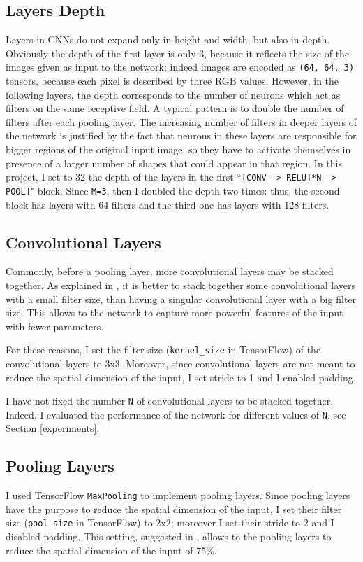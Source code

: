 \documentclass{article}
\begin{document}
\subsection{Layers Depth}
Layers in CNNs do not expand only in height and width, but also in depth.
Obviously the depth of the first layer is only 3, because it reflects the size of the images given as input to the network; indeed images are encoded as \texttt{(64, 64, 3)} tensors, because each pixel is described by three RGB values.
However, in the following layers, the depth corresponds to the number of neurons which act as filters on the same receptive field.
A typical pattern is to double the number of filters after each pooling layer.
The increasing number of filters in deeper layers of the network is justified by the fact that neurons in these layers are responsible for bigger regions of the original input image: so they have to activate themselves in presence of a larger number of shapes that could appear in that region.
In this project, I set to 32 the depth of the layers in the first ``\texttt{[CONV -> RELU]*N -> POOL]}" block.
Since \texttt{M=3}, then I doubled the depth two times: thus, the second block has layers with 64 filters and the third one has layers with 128 filters.

\subsection{Convolutional Layers}
Commonly, before a pooling layer, more convolutional layers may be stacked together.
As explained in \cite{cnnStanford}, it is better to stack together some convolutional layers with a small filter size, than having a singular convolutional layer with a big filter size.
This allows to the network to capture more powerful features of the input with fewer parameters.

For these reasons, I set the filter size (\texttt{kernel\_size} in TensorFlow) of the convolutional layers to 3x3.
Moreover, since convolutional layers are not meant to reduce the spatial dimension of the input, I set stride to 1 and I enabled padding.

I have not fixed the number \texttt{N} of convolutional layers to be stacked together.
Indeed, I evaluated the performance of the network for different values of \texttt{N}, see Section \ref{experiments}.


\subsection{Pooling Layers}
I used TensorFlow \texttt{MaxPooling} to implement pooling layers.
Since pooling layers have the purpose to reduce the spatial dimension of the input, I set their filter size (\texttt{pool\_size} in TensorFlow) to 2x2; moreover I set their stride to 2 and I disabled padding.
This setting, suggested in \cite{cnnStanford}, allows to the pooling layers to reduce the spatial dimension of the input of 75\%.
\end{document}
